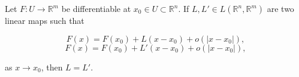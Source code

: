 Let $F: U \to \mathbb{R}^m$ be differentiable at $x_0 \in U \subset \mathbb{R}^n$. If $L, L' \in L(\mathbb{R}^n, \mathbb{R}^m)$ are two linear maps such that

$$F(x) = F(x_0) + L(x - x_0) + o(|x - x_0|),$$
$$F(x) = F(x_0) + L'(x - x_0) + o(|x - x_0|),$$

as $x \to x_0$, then $L = L'$.
